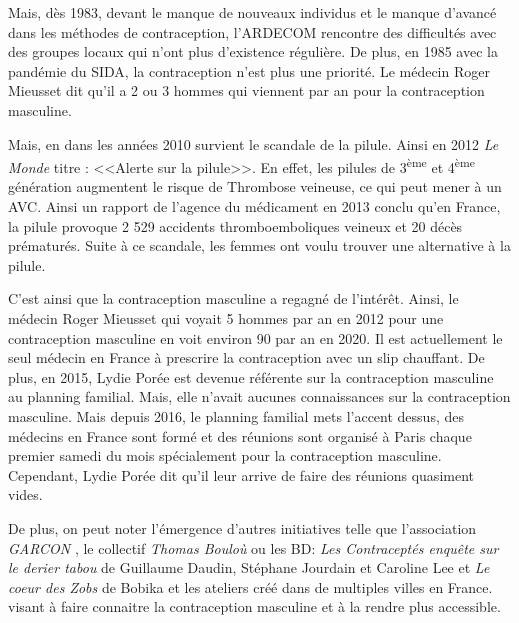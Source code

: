 \documentclass[12pt,a4paper]{report}
\begin{document}
Mais, dès 1983, devant le manque de nouveaux individus et le manque d'avancé dans les méthodes de contraception, l'ARDECOM rencontre des difficultés avec des groupes locaux qui n'ont plus d'existence régulière.
De plus, en 1985 avec la pandémie du SIDA, la contraception n'est plus une priorité.
Le médecin Roger Mieusset dit qu'il a 2 ou 3 hommes qui viennent par an pour la contraception masculine. \cite{guillaumedaudinContraceptesEnqueteDernier2022}

Mais, en dans les années 2010 survient le scandale de la pilule. Ainsi en 2012 \textit{Le Monde} titre : <<Alerte sur la pilule>>.
En effet, les pilules de 3\textsuperscript{ème} et 4\textsuperscript{ème} génération augmentent le risque de Thrombose veineuse, ce qui peut mener à un AVC.
Ainsi un rapport de l'agence du médicament en 2013 conclu qu'en France, la pilule provoque 2 529 accidents thromboemboliques veineux et 20 décès prématurés.
Suite à ce scandale, les femmes ont voulu trouver une alternative à la pilule. \cites{albrechtQuelleEstPlace2023}{guillaumedaudinContraceptesEnqueteDernier2022}{AlertePilule2012}

C'est ainsi que la contraception masculine a regagné de l'intérêt. Ainsi, le médecin Roger Mieusset qui voyait 5 hommes par an en 2012 pour une contraception masculine en voit environ 90 par an en 2020.\cite{guillaumedaudinContraceptesEnqueteDernier2022}
Il est actuellement le seul médecin en France à prescrire la contraception avec un slip chauffant.\cite{bobikaCoeurZobs2022}
De plus, en 2015, Lydie Porée est devenue référente sur la contraception masculine au planning familial.
Mais, elle n'avait aucunes connaissances sur la contraception masculine.
Mais depuis 2016, le planning familial mets l'accent dessus, des médecins en France sont formé et des réunions sont organisé à Paris chaque premier samedi du mois spécialement pour la contraception masculine.
Cependant, Lydie Porée dit qu'il leur arrive de faire des réunions quasiment vides. \cite{guillaumedaudinContraceptesEnqueteDernier2022}

De plus, on peut noter l'émergence d'autres initiatives telle que l'association \textit{GARCON} \cite{QuiSommesNous}, le collectif \textit{Thomas Bouloù} \cite{ThomasBoulouInterview} ou les BD: \textit{Les Contraceptés enquête sur le derier tabou} de Guillaume Daudin, Stéphane Jourdain et Caroline Lee \cite{guillaumedaudinContraceptesEnqueteDernier2022} et \textit{Le coeur des Zobs} de Bobika \cite{bobikaCoeurZobs2022} et les ateliers créé dans de multiples villes en France. \cites{ContraceptionMasculineComment2023}{OuNousTrouver}{guillaumedaudinContraceptesEnqueteDernier2022} visant à faire connaitre la contraception masculine et à la rendre plus accessible.
\end{document}
